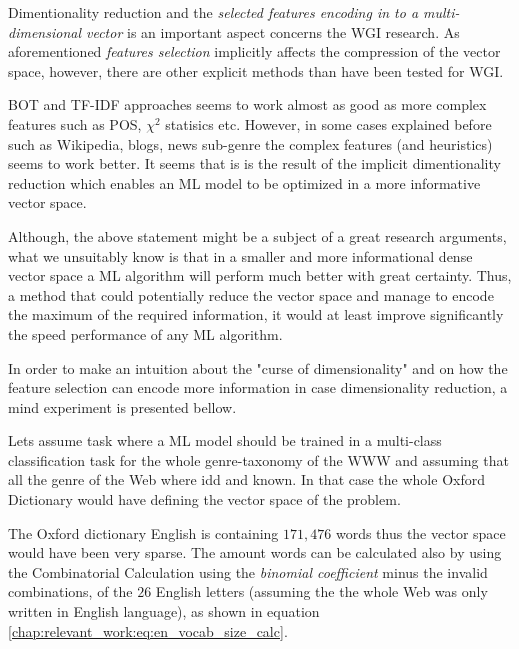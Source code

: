 Dimentionality reduction and the \textit{selected features encoding in to a multi-dimensional vector} is an important aspect concerns the WGI research. As aforementioned \textit{features selection} implicitly affects the compression of the vector space, however, there are other explicit methods than have been tested for WGI.

BOT and TF-IDF approaches seems to work almost as good as more complex features such as POS, $\chi^{2}$ statisics etc. However, in some cases explained before such as Wikipedia, blogs, news sub-genre the complex features (and heuristics) seems to work better. It seems that is is the result of the implicit dimentionality reduction which enables an ML model to be optimized in a more informative vector space.

Although, the above statement might be a subject of a great research arguments, what we unsuitably know is that in a smaller and more informational dense vector space a ML algorithm will perform much better with great certainty. Thus, a method that could potentially reduce the vector space and manage to encode the maximum of the required information, it would at least improve significantly the speed performance of any ML algorithm. 

In order to make an intuition about the "curse of dimensionality"  and on how the feature selection can encode more information in case dimensionality reduction, a mind experiment is presented bellow. 

Lets assume task where a ML model should be trained in a multi-class classification task for the whole genre-taxonomy of the WWW and assuming that all the genre of the Web where idd and known. In that case the whole Oxford Dictionary would have defining the vector space of the problem. 

The Oxford dictionary English is containing $171,476$ words thus the vector space would have been very sparse. The amount words can be calculated also by using the Combinatorial Calculation using the \textit{binomial coefficient} minus the invalid combinations, of the $26$ English letters (assuming the the whole Web was only written in English language), as shown in equation \ref{chap:relevant_work:eq:en_vocab_size_calc}.

